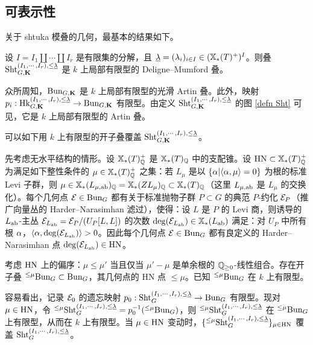 \subsection{可表示性}
关于 shtuka 模叠的几何，最基本的结果如下。
\begin{thm} 设 $I=I_{1}\coprod\cdots\coprod I_{r}$ 是有限集的分解，且 $\underline{\lambda}=(\lambda_{i})_{i\in I}\in (\mathbb{X}_*(T)^{+})^{I}$。则叠 $\textup{Sht}^{(I_{1},\cdots, I_{r}), \le \underline{\lambda}}_{G,\mathbf{K}}$ 是 $k$ 上局部有限型的 Deligne–Mumford 叠。
\end{thm}

众所周知，$\textup{Bun}_{G,\mathbf{K}}$ 是 $k$ 上局部有限型的光滑 Artin 叠。此外，映射 $p_{i}: \textup{Hk}_{G,\mathbf{K}}^{(I_{1},\cdots, I_{r}), \le \underline{\lambda}}\to \textup{Bun}_{G,\mathbf{K}}$ 有限型。由定义 $\textup{Sht}^{(I_{1},\cdots, I_{r}), \le\underline{\lambda}}_{G,\mathbf{K}}$ 的图 \eqref{defn Sht} 可见，它是 $k$ 上局部有限型的 Artin 叠。

\label{sss:HN}
可以如下用 $k$ 上有限型的开子叠覆盖 $\textup{Sht}^{(I_{1},\cdots, I_{r}), \le \underline{\lambda}}_{G,\mathbf{K}}$。

先考虑无水平结构的情形。设 $\mathbb{X}_*(T)^{+}_{\mathbb{Q}}$ 是 $\mathbb{X}_*(T)_{\mathbb{Q}}$ 中的支配锥。设 $\mathrm{HN}\subset \mathbb{X}_*(T)^{+}_{\mathbb{Q}}$ 为满足如下整性条件的 $\mu\in \mathbb{X}_*(T)_{\mathbb{Q}}^{+}$ 之集：若 $L_{\mu}$ 是以 $\{\alpha|\langle{\alpha,\mu}\rangle=0\}$ 为根的标准 Levi 子群，则 $\mu\in \mathbb{X}_*(L_{\mu,\mathrm{ab}})_{\mathbb{Q}}=\mathbb{X}_*(ZL_{\mu})_{\mathbb{Q}}\subset\mathbb{X}_*(T)_{\mathbb{Q}}$（这里 $L_{\mu,\mathrm{ab}}$ 是 $L_{\mu}$ 的交换化）。每个几何点 $\mathcal{E}\in \textup{Bun}_{G}$ 都有关于标准抛物子群 $P\subset G$ 的典范 $P$-约化 $\mathcal{E}_{P}$（推广向量丛的 Harder–Narasimhan 滤过），使得：设 $L$ 是 $P$ 的 Levi 商，则诱导的 $L_{\mathrm{ab}}$-主丛 $\mathcal{E}_{L_{\mathrm{ab}}}=\mathcal{E}_{P}/(U_{P}[L,L])$ 的次数 $\deg(\mathcal{E}_{L_{\mathrm{ab}}})\in \mathbb{X}_*(L_{\mathrm{ab}})$ 满足：对 $U_{P}$ 中所有根 $\alpha$，$\langle{\alpha, \deg(\mathcal{E}_{L_{\mathrm{ab}}})}\rangle>0$。因此每个几何点 $\mathcal{E}\in \textup{Bun}_{G}$ 都有良定义的 Harder–Narasimhan 点 $\deg(\mathcal{E}_{L_{\mathrm{ab}}})\in \mathrm{HN}$。

考虑 $\mathrm{HN}$ 上的偏序：$\mu\le \mu'$ 当且仅当 $\mu'- \mu $ 是单余根的 $\mathbb{Q}_{\ge0}$-线性组合。存在开子叠 ${}^{\le\mu}\textup{Bun}_{G}\subset \textup{Bun}_{G}$，其几何点的 HN 点 $\le \mu$。已知 ${}^{\le\mu}\textup{Bun}_{G}$ 在 $k$ 上有限型。

容易看出，记录 $\mathcal{E}_{0}$ 的遗忘映射 $p_{0}: \textup{Sht}^{(I_{1},\cdots, I_{r}), \le \underline{\lambda}}_{G}\to \textup{Bun}_{G}$ 有限型。现对 $\mu\in \mathrm{HN}$，令 ${}^{\le \mu}\textup{Sht}^{(I_{1},\cdots, I_{r}), \le \underline{\lambda}}_{G}=p_{0}^{-1}({}^{\le \mu}\textup{Bun}_{G})$，则 ${}^{\le \mu}\textup{Sht}^{(I_{1},\cdots, I_{r}), \le \underline{\lambda}}_{G}$ 在 ${}^{\le \mu}\textup{Bun}_{G}$ 上有限型，从而在 $k$ 上有限型。当 $\mu\in \mathrm{HN}$ 变动时，$\{{}^{\le \mu}\textup{Sht}^{(I_{1},\cdots, I_{r}),\le\underline{\lambda}}_{G}\}_{\mu\in\mathrm{HN}}$ 覆盖 $\textup{Sht}^{(I_{1},\cdots, I_{r}),\le\underline{\lambda}}_{G}$。

